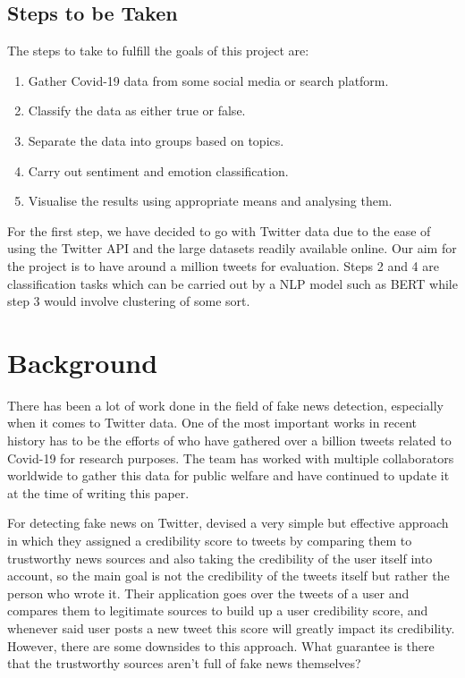 \documentclass{l4proj}
\begin{document}
\section{Steps to be Taken}
The steps to take to fulfill the goals of this project are:

\vspace{0.4cm}
\begin{enumerate}
    \item
    Gather Covid-19 data from some social media or search platform.
    \item
    Classify the data as either true or false.
    \item
    Separate the data into groups based on topics.
    \item
    Carry out sentiment and emotion classification.
    \item
    Visualise the results using appropriate means and analysing them.
\end{enumerate}
\vspace{0.4cm}

For the first step, we have decided to go with Twitter data due to the ease of using the Twitter API and the large datasets readily available online. Our aim for the project is to have around a million tweets for evaluation. Steps 2 and 4 are classification tasks which can be carried out by a NLP model such as BERT while step 3 would involve clustering of some sort.

\chapter{Background}

There has been a lot of work done in the field of fake news detection, especially when it comes to Twitter data. One of the most important works in recent history has to be the efforts of \cite{banda_juan_m_2021_5652342} who have gathered over a billion tweets related to Covid-19 for research purposes. The team has worked with multiple collaborators worldwide to gather this data for public welfare and have continued to update it at the time of writing this paper.

For detecting fake news on Twitter, \cite{ATODIRESEI2018451} devised a very simple but effective approach in which they assigned a credibility score to tweets by comparing them to trustworthy news sources and also taking the credibility of the user itself into account, so the main goal is not the credibility of the tweets itself but rather the person who wrote it. Their application goes over the tweets of a user and compares them to legitimate sources to build up a user credibility score, and whenever said user posts a new tweet this score will greatly impact its credibility. However, there are some downsides to this approach. What guarantee is there that the trustworthy sources aren't full of fake news themselves?
\end{document}

